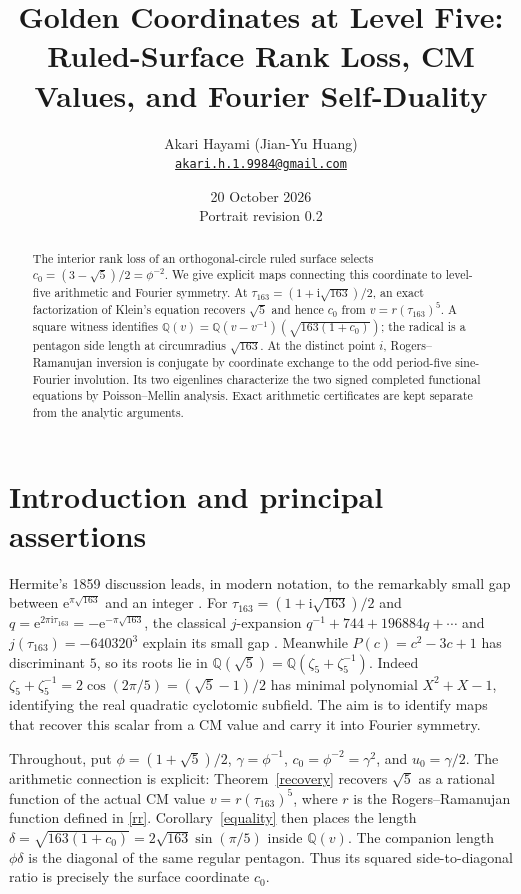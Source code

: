 \documentclass[11pt]{article}
\title{Golden Coordinates at Level Five: Ruled-Surface Rank Loss, CM Values, and Fourier Self-Duality}
\author{Akari Hayami (Jian-Yu Huang)\\{\small\href{mailto:akari.h.1.9984@gmail.com}{\nolinkurl{akari.h.1.9984@gmail.com}}}}\date{20 October 2026\\Portrait revision 0.2}
\newcommand{\Q}{\mathbb Q}\newcommand{\R}{\mathbb R}\newcommand{\ii}{\mathrm i}\newcommand{\e}{\mathrm e}\newcommand{\Fcal}{\mathcal F}\newcommand{\Tcal}{\mathcal T}
\begin{document}
\maketitle
\begin{abstract}
The interior rank loss of an orthogonal-circle ruled surface selects
$c_0=(3-\sqrt5)/2=\phi^{-2}$. We give explicit maps connecting this coordinate
to level-five arithmetic and Fourier symmetry. At
$\tau_{163}=(1+\ii\sqrt{163})/2$, an exact factorization of Klein's equation
recovers $\sqrt5$ and hence $c_0$ from $v=r(\tau_{163})^5$. A square witness
identifies $\Q(v)=\Q(v-v^{-1})(\sqrt{163(1+c_0)})$; the radical is a
pentagon side length at circumradius $\sqrt{163}$. At the distinct point $i$,
Rogers--Ramanujan inversion is conjugate by coordinate exchange to the odd
period-five sine-Fourier involution. Its two eigenlines characterize the two
signed completed functional equations by Poisson--Mellin analysis. Exact
arithmetic certificates are kept separate from the analytic arguments.
\end{abstract}

\section{Introduction and principal assertions}\label{sec:intro}
Hermite's 1859 discussion leads, in modern notation, to the remarkably small
gap between $\e^{\pi\sqrt{163}}$ and an integer \cite[pp.~47--48]{Hermite}.  For
$\tau_{163}=(1+\ii\sqrt{163})/2$ and
$q=\e^{2\pi\ii\tau_{163}}=-\e^{-\pi\sqrt{163}}$, the classical
$j$-expansion $q^{-1}+744+196884q+\cdots$ and
$j(\tau_{163})=-640320^3$ explain its small gap \cite{Duke}.
Meanwhile $P(c)=c^2-3c+1$ has discriminant $5$, so its roots lie in
$\Q(\sqrt5)=\Q(\zeta_5+\zeta_5^{-1})$.
Indeed $\zeta_5+\zeta_5^{-1}=2\cos(2\pi/5)=(\sqrt5-1)/2$ has minimal
polynomial $X^2+X-1$, identifying the real quadratic cyclotomic subfield.  The aim is to identify maps that recover this scalar from a CM value and
carry it into Fourier symmetry.

Throughout, put $\phi=(1+\sqrt5)/2$, $\gamma=\phi^{-1}$,
$c_0=\phi^{-2}=\gamma^2$, and $u_0=\gamma/2$.
The arithmetic connection is explicit: Theorem~\ref{recovery} recovers
$\sqrt5$ as a rational function of the actual CM value $v=r(\tau_{163})^5$,
where $r$ is the Rogers--Ramanujan function defined in \eqref{rr}.
Corollary~\ref{equality} then places the length
$\delta=\sqrt{163(1+c_0)}=2\sqrt{163}\sin(\pi/5)$ inside $\Q(v)$.
The companion length $\phi\delta$ is the diagonal of the same regular
pentagon. Thus its squared side-to-diagonal ratio is precisely the surface
coordinate $c_0$.
\end{document}
